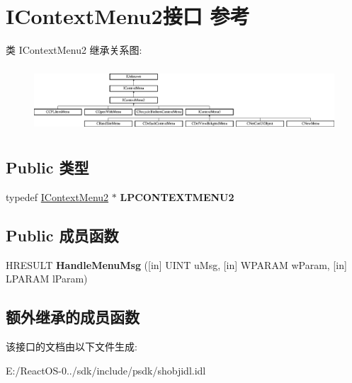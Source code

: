 \hypertarget{interface_i_context_menu2}{}\section{I\+Context\+Menu2接口 参考}
\label{interface_i_context_menu2}
类 I\+Context\+Menu2 继承关系图\+:\begin{figure}[H]
\begin{center}
\leavevmode
\includegraphics[height=2.469136cm]{interface_i_context_menu2}
\end{center}
\end{figure}
\subsection*{Public 类型}
\begin{DoxyCompactItemize}
\item 
\mbox{\label{interface_i_context_menu2_a05156ef6a524d4359166cc596e79bdac}} 
typedef \hyperlink{interface_i_context_menu2}{I\+Context\+Menu2} $\ast$ {\bfseries L\+P\+C\+O\+N\+T\+E\+X\+T\+M\+E\+N\+U2}
\end{DoxyCompactItemize}
\subsection*{Public 成员函数}
\begin{DoxyCompactItemize}
\item 
\mbox{\label{interface_i_context_menu2_a4b93ef0094d5974987774866f4636b4a}} 
H\+R\+E\+S\+U\+LT {\bfseries Handle\+Menu\+Msg} (\mbox{[}in\mbox{]} U\+I\+NT u\+Msg, \mbox{[}in\mbox{]} W\+P\+A\+R\+AM w\+Param, \mbox{[}in\mbox{]} L\+P\+A\+R\+AM l\+Param)
\end{DoxyCompactItemize}
\subsection*{额外继承的成员函数}


该接口的文档由以下文件生成\+:\begin{DoxyCompactItemize}
\item 
E\+:/\+React\+O\+S-\/0../sdk/include/psdk/shobjidl.\+idl\end{DoxyCompactItemize}
